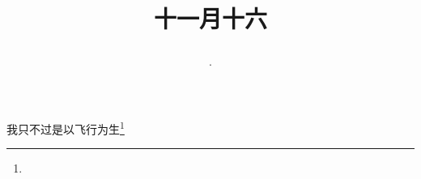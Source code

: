 \title{\date[d=16,m=12,y=2024][year:cn-y,年,month:cn,day:cn,日,·,weekday]·十一月十六 }
我只不过是以飞行为生\footnote{ }

